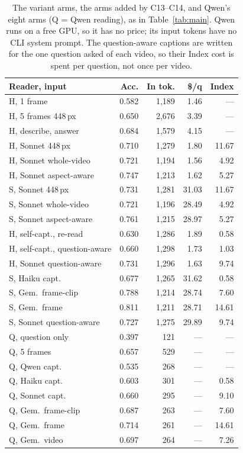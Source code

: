 \documentclass[11pt]{article}
\begin{document}
\begin{table}[t]
\centering
\footnotesize
\setlength{\tabcolsep}{2.5pt}
\begin{tabular}{@{}lrrrr@{}}
\toprule
Reader, input & Acc. & In tok. & \$/q & Index \\
\midrule
H, 1 frame & 0.582 & 1,189 & 1.46 & — \\
H, 5 frames 448\,px & 0.650 & 2,676 & 3.39 & — \\
H, describe, answer & 0.684 & 1,579 & 4.15 & — \\
H, Sonnet 448\,px & 0.710 & 1,279 & 1.80 & 11.67 \\
H, Sonnet whole-video & 0.721 & 1,194 & 1.56 & 4.92 \\
H, Sonnet aspect-aware & 0.747 & 1,213 & 1.62 & 5.27 \\
S, Sonnet 448\,px & 0.731 & 1,281 & 31.03 & 11.67 \\
S, Sonnet whole-video & 0.721 & 1,196 & 28.49 & 4.92 \\
S, Sonnet aspect-aware & 0.761 & 1,215 & 28.97 & 5.27 \\
\midrule
H, self-capt., re-read & 0.630 & 1,286 & 1.89 & 0.58 \\
H, self-capt., question-aware & 0.660 & 1,298 & 1.73 & 1.03 \\
H, Sonnet question-aware & 0.731 & 1,296 & 1.63 & 9.74 \\
S, Haiku capt. & 0.677 & 1,265 & 31.62 & 0.58 \\
S, Gem.\ frame-clip & 0.788 & 1,214 & 28.74 & 7.60 \\
S, Gem.\ frame & 0.811 & 1,211 & 28.71 & 14.61 \\
S, Sonnet question-aware & 0.727 & 1,275 & 29.89 & 9.74 \\
\midrule
Q, question only & 0.397 & 121 & — & — \\
Q, 5 frames & 0.657 & 529 & — & — \\
Q, Qwen capt. & 0.535 & 268 & — & — \\
Q, Haiku capt. & 0.603 & 301 & — & 0.58 \\
Q, Sonnet capt. & 0.660 & 295 & — & 9.10 \\
Q, Gem.\ frame-clip & 0.687 & 263 & — & 7.60 \\
Q, Gem.\ frame & 0.714 & 261 & — & 14.61 \\
Q, Gem.\ video & 0.697 & 264 & — & 7.26 \\
\bottomrule
\end{tabular}
\caption{The variant arms, the arms added by C13--C14, and Qwen's eight arms (Q = Qwen reading), as in Table~\ref{tab:main}. Qwen runs on a free GPU, so it has no price; its input tokens have no CLI system prompt. The question-aware captions are written for the one question asked of each video, so their Index cost is spent per question, not once per video.}
\label{tab:variants}
\end{table}
\end{document}
